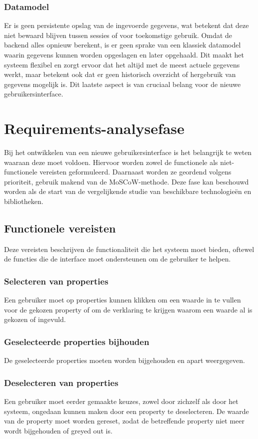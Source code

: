 \subsubsection{Datamodel}
Er is geen persistente opslag van de ingevoerde gegevens, wat betekent dat deze niet bewaard blijven tussen sessies of voor toekomstige gebruik. Omdat de backend alles opnieuw berekent, is er geen sprake van een klassiek datamodel waarin gegevens kunnen worden opgeslagen en later opgehaald. Dit maakt het systeem flexibel en zorgt ervoor dat het altijd met de meest actuele gegevens werkt, maar betekent ook dat er geen historisch overzicht of hergebruik van gegevens mogelijk is. Dit laatste aspect is van cruciaal belang voor de nieuwe gebruikersinterface.

\section{Requirements-analysefase}
Bij het ontwikkelen van een nieuwe gebruikersinterface is het belangrijk te weten waaraan deze moet voldoen. Hiervoor worden zowel de functionele als niet-functionele vereisten geformuleerd. Daarnaast worden ze geordend volgens prioriteit, gebruik makend van de MoSCoW-methode. Deze fase kan beschouwd worden als de start van de vergelijken\-de studie van beschikbare technologieën en bibliotheken.

\subsection{Functionele vereisten}
Deze vereisten beschrijven de functionaliteit die het systeem moet bieden, oftewel de functies die de interface moet ondersteunen om de gebruiker te helpen.

\subsubsection{Selecteren van properties}
Een gebruiker moet op properties kunnen klikken om een waarde in te vullen voor de gekozen property of om de verklaring te krijgen waarom een waarde al is gekozen of ingevuld.

\subsubsection{Geselecteerde properties bijhouden}
De geselecteerde properties moeten worden bijgehouden en apart weergegeven.

\subsubsection{Deselecteren van properties}
Een gebruiker moet eerder gemaakte keuzes, zowel door zichzelf als door het systeem, ongedaan kunnen maken door een property te deselecteren. De waarde van de property moet worden gereset, zodat de betreffende property niet meer wordt bijgehouden of greyed out is.

